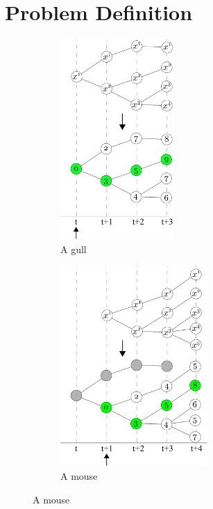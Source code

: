 \section{Problem Definition}

\begin{figure}[t]
\centering
\begin{subfigure}[b]{0.3\textwidth}
\includegraphics[height=3in]{plan_at_t0}
\caption{A gull}
\label{fig:plan_at_t0}
\end{subfigure}
\hspace{1in}
\begin{subfigure}[b]{0.3\textwidth}
\includegraphics[height=3in]{plan_at_t1}
\caption{A mouse}
\label{fig:plan_at_t1}
\end{subfigure}%

\end{figure}



